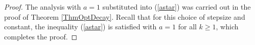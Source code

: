 \begin{proof}

The analysis with $a=1$ substituted into (\ref{astar}) was carried out in the proof of Theorem \ref{ThmOptDecay}. Recall that for this choice of stepsize and constant, the inequality (\ref{astar}) is satisfied with $a=1$ for all $k\geq 1$, which completes the proof.  



\end{proof}